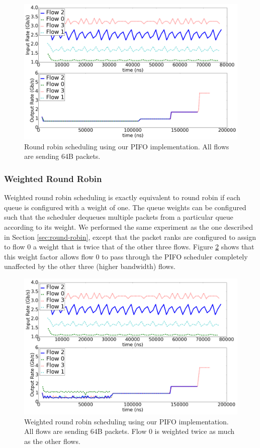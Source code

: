 \begin{figure}[!h]
\includegraphics[width=1\linewidth]{figures/eval/rr_rates}
\caption{Round robin scheduling using our PIFO implementation. All flows are sending 64B packets.}
\label{fig:rr_rates}
\end{figure}

\subsubsection*{Weighted Round Robin}

Weighted round robin scheduling is exactly equivalent to round robin if each queue is configured with a weight of one. The queue weights can be configured such that the scheduler dequeues multiple packets from a particular queue according to its weight. We performed the same experiment as the one described in Section \ref{sec:round-robin}, except that the packet ranks are configured to assign to flow 0 a weight that is twice that of the other three flows. Figure \ref{fig:wrr_rates} shows that this weight factor allows flow 0 to pass through the PIFO scheduler completely unaffected by the other three (higher bandwidth) flows.

\begin{figure}[!h]
\includegraphics[width=1\linewidth]{figures/eval/wrr_rates}
\caption{Weighted round robin scheduling using our PIFO implementation. All flows are sending 64B packets. Flow 0 is weighted twice as much as the other flows.}
\label{fig:wrr_rates}
\end{figure}




